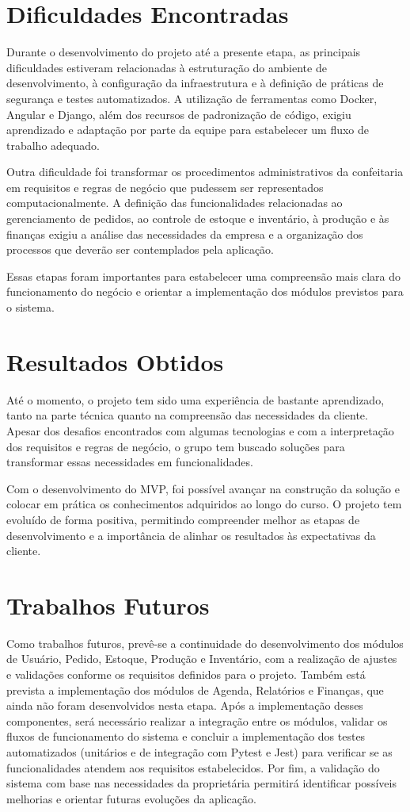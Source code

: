 \section{Dificuldades Encontradas}

Durante o desenvolvimento do projeto até a presente etapa, as principais dificuldades estiveram relacionadas à estruturação do ambiente de desenvolvimento, à configuração da infraestrutura e à definição de práticas de segurança e testes automatizados. A utilização de ferramentas como Docker, Angular e Django, além dos recursos de padronização de código, exigiu aprendizado e adaptação por parte da equipe para estabelecer um fluxo de trabalho adequado.

Outra dificuldade foi transformar os procedimentos administrativos da confeitaria em requisitos e regras de negócio que pudessem ser representados computacionalmente. A definição das funcionalidades relacionadas ao gerenciamento de pedidos, ao controle de estoque e inventário, à produção e às finanças exigiu a análise das necessidades da empresa e a organização dos processos que deverão ser contemplados pela aplicação.

Essas etapas foram importantes para estabelecer uma compreensão mais clara do funcionamento do negócio e orientar a implementação dos módulos previstos para o sistema.

\section{Resultados Obtidos}
Até o momento, o projeto tem sido uma experiência de bastante aprendizado, tanto na parte técnica quanto na compreensão das necessidades da cliente. Apesar dos desafios encontrados com algumas tecnologias e com a interpretação dos requisitos e regras de negócio, o grupo tem buscado soluções para transformar essas necessidades em funcionalidades.

Com o desenvolvimento do MVP, foi possível avançar na construção da solução e colocar em prática os conhecimentos adquiridos ao longo do curso. O projeto tem evoluído de forma positiva, permitindo compreender melhor as etapas de desenvolvimento e a importância de alinhar os resultados às expectativas da cliente.


\section{Trabalhos Futuros}

Como trabalhos futuros, prevê-se a continuidade do desenvolvimento dos módulos de Usuário, Pedido, Estoque, Produção e Inventário, com a realização de ajustes e validações conforme os requisitos definidos para o projeto. Também está prevista a implementação dos módulos de Agenda, Relatórios e Finanças, que ainda não foram desenvolvidos nesta etapa.
Após a implementação desses componentes, será necessário realizar a integração entre os módulos, validar os fluxos de funcionamento do sistema e concluir a implementação dos testes automatizados (unitários e de integração com Pytest e Jest) para verificar se as funcionalidades atendem aos requisitos estabelecidos.
Por fim, a validação do sistema com base nas necessidades da proprietária permitirá identificar possíveis melhorias e orientar futuras evoluções da aplicação.